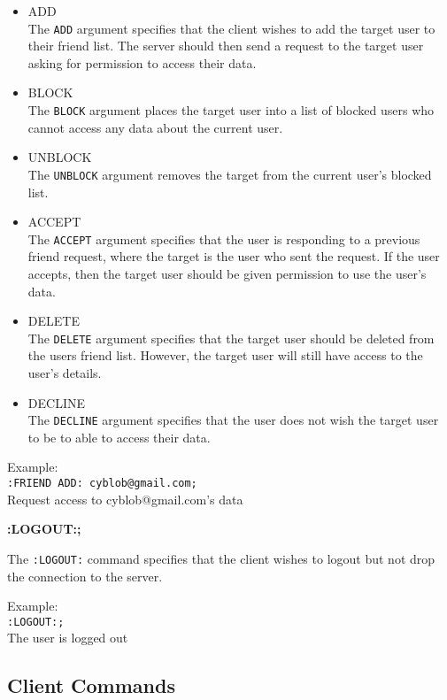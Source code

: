 \begin{itemize}

\item{ADD \\
The \texttt{ADD} argument specifies that the client wishes to add the target user to their friend list. The server should then send a request to the target user asking for permission to access their data.}

\item{BLOCK \\
The \texttt{BLOCK} argument places the target user into a list of blocked users who cannot access any data about the current user.}

\item{UNBLOCK \\
The \texttt{UNBLOCK} argument removes the target from the current user's blocked list.}

\item{ACCEPT \\
The \texttt{ACCEPT} argument specifies that the user is responding to a previous friend request, where the target is the user who sent the request. If the user accepts, then the target user should be given permission to use the user's data.}

\item{DELETE \\
The \texttt{DELETE} argument specifies that the target user should be deleted from the users friend list. However, the target user will still have access to the user's details.}

\item{DECLINE \\
The \texttt{DECLINE} argument specifies that the user does not wish the target user to be to able to access their data.}

\end{itemize}

Example: \\
\texttt{:FRIEND ADD: cyblob@gmail.com;}	\\
Request access to cyblob@gmail.com's data

{\bf :LOGOUT:;}

The \texttt{:LOGOUT:} command specifies that the client wishes to logout but not drop the connection to the server.

Example: \\
\texttt{:LOGOUT:;}\\
The user is logged out

\subsection{Client Commands}
\label{clientcomm_post}

